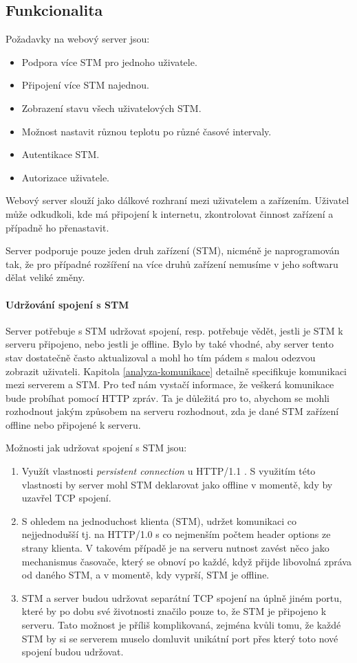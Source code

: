 
\subsection{Funkcionalita}
Požadavky na webový server jsou:
\begin{itemize}
  \item Podpora více STM pro jednoho uživatele.
  \item Připojení více STM najednou.
  \item Zobrazení stavu všech uživatelových STM.
  \item Možnost nastavit různou teplotu po různé časové intervaly.
  \item Autentikace STM.
  \item Autorizace uživatele.
\end{itemize}
Webový server slouží jako dálkové rozhraní mezi uživatelem a zařízením.
Uživatel může odkudkoli, kde má připojení k internetu, zkontrolovat činnost zařízení
a případně ho přenastavit.

Server podporuje pouze jeden druh zařízení (STM), nicméně je naprogramován
tak, že pro případné rozšíření na více druhů zařízení nemusíme v jeho softwaru dělat veliké změny.

\paragraph{Udržování spojení s STM}
Server potřebuje s STM udržovat spojení, resp. potřebuje vědět, jestli je STM k serveru připojeno,
nebo jestli je offline.
Bylo by také vhodné, aby server tento stav dostatečně často aktualizoval a mohl ho tím pádem s malou
odezvou zobrazit uživateli.
Kapitola \ref{analyza-komunikace} detailně specifikuje komunikaci mezi serverem a STM.
Pro teď nám vystačí informace, že veškerá komunikace bude probíhat pomocí HTTP zpráv.
Ta je důležitá pro to, abychom se mohli rozhodnout jakým způsobem na serveru rozhodnout, zda je dané
STM zařízení offline nebo připojené k serveru.

Možnosti jak udržovat spojení s STM jsou:
\begin{enumerate}
  \item Využít vlastnosti \emph{persistent connection} u HTTP/1.1 \cite{HTTP-persistent-connection}.
    S využitím této vlastnosti by server mohl STM deklarovat jako offline v momentě, kdy by uzavřel
    TCP spojení.
  \item S ohledem na jednoduchost klienta (STM), udržet komunikaci co nejjednodušší tj.
    na HTTP/1.0 s co nejmenším počtem header options ze strany klienta.
    V takovém případě je na serveru nutnost zavést něco jako mechanismus časovače, který se obnoví po každé,
    když přijde libovolná zpráva od daného STM, a v momentě, kdy vyprší, STM je offline.
  \item STM a server budou udržovat separátní TCP spojení na úplně jiném portu, které
    by po dobu své životnosti značilo pouze to, že STM je připojeno k serveru.
    Tato možnost je příliš komplikovaná, zejména kvůli tomu, že každé STM by si se serverem muselo domluvit
    unikátní port přes který toto nové spojení budou udržovat.
\end{enumerate}

